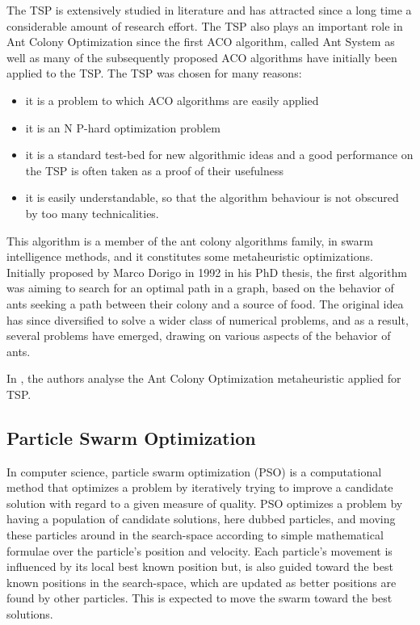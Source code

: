 The TSP is extensively studied in literature and has attracted since
a long time a considerable amount of research effort. The TSP also plays an
important role in Ant Colony Optimization since the first ACO algorithm, called Ant System as well as many of the subsequently proposed ACO algorithms  have initially been applied to the TSP. The TSP was chosen for many reasons:

\begin{itemize}
 \item it is a problem to which ACO algorithms are easily applied
 \item it is an N P-hard optimization problem
 \item it is a standard test-bed for new algorithmic ideas and a good performance on the TSP is often taken as a proof of their usefulness
 \item it is easily understandable, so that the algorithm behaviour is not obscured by too many technicalities.
\end{itemize}

This algorithm is a member of the ant colony algorithms family, in swarm intelligence methods, and it constitutes some metaheuristic optimizations. Initially proposed by Marco Dorigo in 1992 in his PhD thesis, the first algorithm was aiming to search for an optimal path in a graph, based on the behavior of ants seeking a path between their colony and a source of food. The original idea has since diversified to solve a wider class of numerical problems, and as a result, several problems have emerged, drawing on various aspects of the behavior of ants.

In \cite{Dorigo06antcolony}, the authors analyse the Ant Colony Optimization metaheuristic applied for TSP.


\subsection{Particle Swarm Optimization}

In computer science, particle swarm optimization (PSO) is a computational method that optimizes a problem by iteratively trying to improve a candidate solution with regard to a given measure of quality. PSO optimizes a problem by having a population of candidate solutions, here dubbed particles, and moving these particles around in the search-space according to simple mathematical formulae over the particle's position and velocity. Each particle's movement is influenced by its local best known position but, is also guided toward the best known positions in the search-space, which are updated as better positions are found by other particles. This is expected to move the swarm toward the best solutions.

